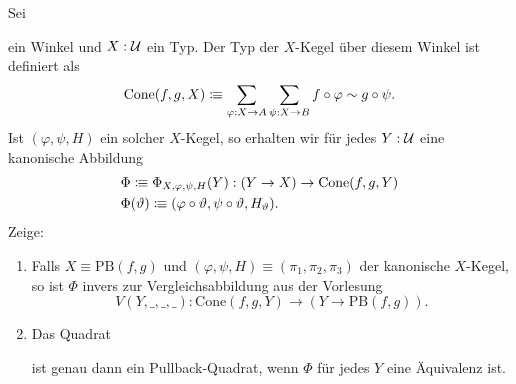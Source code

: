 \documentclass{uebung}
\begin{document}
\begin{exercise}
  Sei
  ein Winkel und $X:\mathcal{U}$ ein Typ.
  Der Typ der $X$-Kegel über diesem Winkel ist definiert als
  $$
  \mathrm{Cone}(f,g,X) \vcentcolon\mspace{-1.2mu}\equiv \sum_{\varphi:X\to A}\sum_{\psi:X\to B} f\circ\varphi \sim g\circ\psi.
  $$
  Ist $(\varphi,\psi,H)$ ein solcher $X$-Kegel, so erhalten wir für jedes $Y:\mathcal{U}$ eine kanonische Abbildung
  \begin{align*}
    &\Phi\vcentcolon\mspace{-1.2mu}\equiv\Phi_{X,\varphi,\psi,H}(Y):(Y \to X) \to \mathrm{Cone}(f,g,Y)\\
    &\Phi(\vartheta)\vcentcolon\mspace{-1.2mu}\equiv (\varphi\circ\vartheta,\psi\circ\vartheta,H_\vartheta).
  \end{align*}
  Zeige:
  \begin{enumerate}
    \item Falls $X\equiv\mathrm{PB}(f,g)$ und $(\varphi,\psi,H)\equiv(\pi_1,\pi_2,\pi_3)$ der kanonische $X$-Kegel, so ist $\Phi$ invers zur Vergleichsabbildung aus der Vorlesung
      $$
      V(Y,\_,\_,\_):\mathrm{Cone}(f,g,Y)\to (Y\to\mathrm{PB}(f,g)).
      $$
    \item Das Quadrat
      \begin{center}
      \end{center}
      ist genau dann ein Pullback-Quadrat, wenn $\Phi$ für jedes $Y$ eine Äquivalenz ist.
  \end{enumerate}
\end{exercise}
\end{document}
